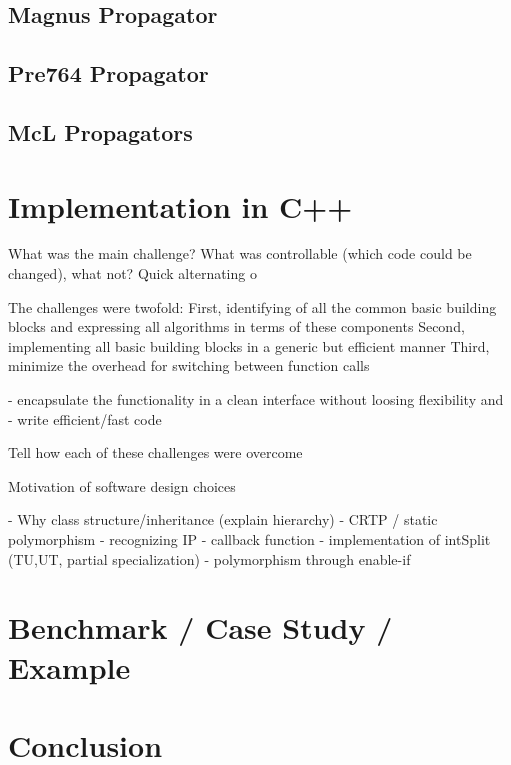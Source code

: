 \subsection{Magnus Propagator}


\subsection{Pre764 Propagator}


\subsection{McL Propagators}



\clearpage
\section{Implementation in C++}

\cite{libwaveblocks}
What was the main challenge? What was controllable (which code could be changed), what not? 
Quick alternating o

The challenges were twofold: 
First, identifying of all the common basic building blocks and expressing all algorithms in terms of these components
Second, implementing all basic building blocks in a generic but efficient manner
Third, minimize the overhead for switching between function calls

 - encapsulate the functionality in a clean interface without loosing flexibility and 
 - write efficient/fast code

Tell how each of these challenges were overcome


Motivation of software design choices

	- Why class structure/inheritance (explain hierarchy)
	- CRTP / static polymorphism \cite{C_CRTP}
	- recognizing IP
	- callback function
	- implementation of intSplit (TU,UT, partial specialization)
	- polymorphism through enable-if




\clearpage
\section{Benchmark / Case Study / Example}


\clearpage
\section{Conclusion}

